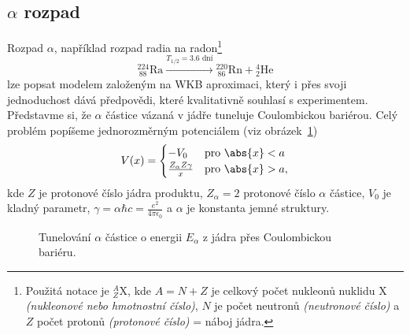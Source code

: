 \subsection{$\alpha$ rozpad}
	Rozpad $\alpha$, například rozpad radia na radon\footnote{
		Použitá notace je ${}^{A}_{Z}\mathrm{X}$, kde $A=N+Z$ je celkový počet nukleonů nuklidu $\mathrm{X}$ \emph{(nukleonové nebo hmotnostní číslo)}, $N$ je počet neutronů \emph{(neutronové číslo)} a $Z$ počet protonů \emph{(protonové číslo)} = náboj jádra.
	}
	\begin{equation}
		{}^{224}_{\ 88}\mathrm{Ra}\stackrel{T_{1/2}=3.6\text{ dní}}{\longrightarrow}{}^{220}_{\ 86}\mathrm{Rn}+{}^{4}_{2}\mathrm{He}
	\end{equation}
	lze popsat modelem založeným na WKB aproximaci, který i přes svoji jednoduchost dává předpovědi, které kvalitativně souhlasí s experimentem.
	Představme si, že $\alpha$ částice vázaná v jádře tuneluje Coulombickou bariérou.
	Celý problém popíšeme jednorozměrným potenciálem (viz obrázek~\ref{fig:AlphaDecay})
	\begin{equation}
		V(x)=
			\begin{cases}
				-V_{0} & \text{pro }\abs{x}<a \\
				\frac{Z_{\alpha}Z\gamma}{x} & \text{pro }\abs{x}>a,
			\end{cases}
		\label{eq:AlphaDecayPotential}
	\end{equation}
	kde $Z$ je protonové číslo jádra produktu, $Z_{\alpha}=2$ protonové číslo $\alpha$ částice, $V_{0}$ je kladný parametr,
	$\gamma=\alpha\hbar c=\frac{e^{2}}{4\pi\epsilon_{0}}$ a $\alpha$ je konstanta jemné struktury.

	\begin{figure}[!htbp]
		\centering
		\caption{
			Tunelování $\alpha$ částice o energii $E_{\alpha}$ z jádra přes Coulombickou bariéru.
		}
		\label{fig:AlphaDecay}
	\end{figure}	

